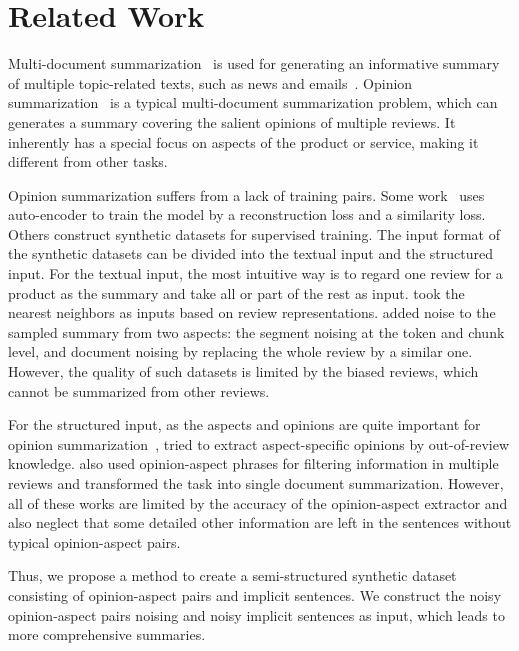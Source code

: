 \section{Related Work}
\label{sec:related}

Multi-document summarization~\cite{abs-2011-04843} is used for generating an informative summary of multiple topic-related texts, such as 
news\cite{FabbriLSLR19} and emails~\cite{ZajicDL08}.
Opinion summarization~\cite{GeraniMCNN14} is a typical multi-document summarization problem,
which can generates
a summary covering the salient opinions %
of multiple reviews. It inherently has a special focus on aspects of the product or service, making it different from other tasks.

Opinion summarization suffers from a lack of training pairs. 
Some work~\cite{MeanSum19} uses auto-encoder to train the model 
by a reconstruction loss and a similarity loss. 
Others construct synthetic datasets for supervised training. 
The input format of the synthetic datasets can be divided into the textual input and the structured input.
For the textual input,
the most intuitive way 
\citet{Copycat20, Fewshot20} is to 
regard one review for a product as the summary 
and take all or part of the rest as input. 
\citet{Plansum20} took the nearest neighbors as inputs based on review representations.
\citet{Denoise20} added noise to the sampled summary from two aspects: the segment noising at the token and chunk level, and document noising by replacing the whole review by a similar one. 
However, the quality of such datasets is limited by the biased reviews, 
which cannot be summarized from other reviews. 


For the structured input, as the aspects and opinions are quite important for opinion summarization~\cite{MukherjeePVGBG20},
 \citet{AngelidisL18} tried to extract aspect-specific opinions by out-of-review knowledge. 
\citet{OpiDig20} also used opinion-aspect phrases for filtering information in multiple reviews and transformed the task into single document summarization. 
However, all of these works are limited by the accuracy of the opinion-aspect extractor and also
neglect that some detailed other information are left in the sentences without typical opinion-aspect pairs. 

Thus, we propose a method to create a semi-structured synthetic dataset consisting of
opinion-aspect pairs and implicit sentences. 
We construct the noisy opinion-aspect pairs noising and noisy implicit sentences as input, which leads to more comprehensive summaries.  
